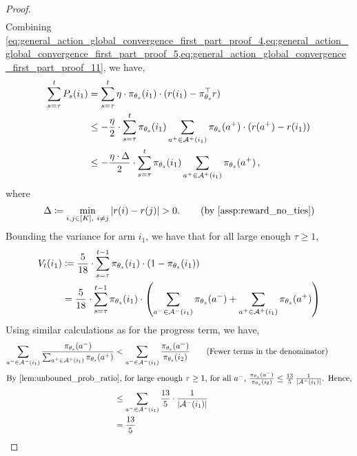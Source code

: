 \begin{proof}
\begin{align}
\end{align}
Combining \cref{eq:general_action_global_convergence_first_part_proof_4,eq:general_action_global_convergence_first_part_proof_5,eq:general_action_global_convergence_first_part_proof_11}, we have,
\begin{align}
    \sum_{s=\tau}^t P_s(i_1) &= \sum_{s=\tau}^t \eta \cdot \pi_{\theta_s}(i_1) \cdot ( r(i_1) - \pi_{\theta_s}^\top r ) \\
    &\le - \frac{\eta}{2} \cdot \sum_{s=\tau}^t \pi_{\theta_s}(i_1) \sum_{a^+ \in {\mathcal{A}}^+(i_1)}{ \pi_{\theta_s}(a^+) \cdot (r(a^+) - r(i_1) ) } \\
    &\le - \frac{\eta \cdot \Delta}{2} \cdot \sum_{s=\tau}^t \pi_{\theta_s}(i_1) \sum_{a^+ \in {\mathcal{A}}^+(i_1)}{ \pi_{\theta_s}(a^+) } \label{eq:general_action_global_convergence_first_part_proof_12} \,,
\end{align}
where
\begin{align}
\label{eq:general_action_global_convergence_first_part_proof_13}
    \Delta \coloneqq \min_{i, j \in [K], \ i \not= j}{ |r(i) - r(j)| } > 0. \qquad \left( \text{by \cref{assp:reward_no_ties}} \right)
\end{align}
Bounding the variance for arm $i_1$, we have that for all large enough $\tau \ge 1$,
\begin{align}
    V_t(i_1) &\coloneqq \frac{5}{18} \cdot \sum_{s=\tau}^{t-1}  \pi_{\theta_s}(i_1) \cdot (1-\pi_{\theta_s}(i_1)) \\
    &= \frac{5}{18} \cdot \sum_{s=\tau}^{t-1}  \pi_{\theta_s}(i_1) \cdot \left( \sum_{a^- \in {\mathcal{A}}^-(i_1)} \pi_{\theta_s}(a^-) + \sum_{a^+ \in {\mathcal{A}}^+(i_1)} \pi_{\theta_s}(a^+) \right) \label{eq:general_action_global_convergence_first_part_proof_14}
\end{align}
Using similar calculations as for the progress term, we have,
\begin{align}
    \sum_{a^- \in \gA^-(i_1)} \frac{ \pi_{\theta_s}(a^-) }{ \sum_{a^+ \in \gA^+(i_1)} \pi_{\theta_s}(a^+) } &< \sum_{a^- \in \gA^-(i_1)} \frac{ \pi_{\theta_s}(a^-) }{  \pi_{\theta_s}(i_2) } \tag{Fewer terms in the denominator} \\
    \intertext{By \cref{lem:unbouned_prob_ratio}, for large enough $\tau \geq 1$, for all $a^-$, $\frac{\pi_{\theta_s}(a^-)}{ \pi_{\theta_s}(i_2)} \leq \frac{13}{5} \, \frac{1}{\left| \gA^-(i_1) \right|}$. Hence,}
    &\le \sum_{a^- \in \gA^-(i_1)}{ \frac{13}{5} \cdot \frac{1}{\left| \gA^-(i_1) \right|} } \\
    &= \frac{13}{5} \\

\end{align}
\end{proof}
